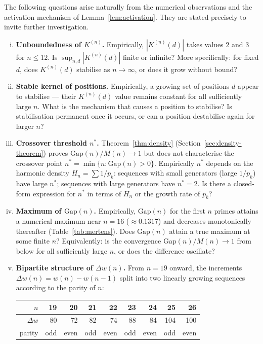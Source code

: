\documentclass[11pt,a4paper]{amsart}
\theoremstyle{plain}
\theoremstyle{definition}
\theoremstyle{remark}
\begin{document}
The following questions arise naturally from the numerical observations
and the activation mechanism of Lemma~\ref{lem:activation}.
They are stated precisely to invite further investigation.

\begin{enumerate}[(i)]

\item \textbf{Unboundedness of $K^{(n)}$.}
Empirically, $|K^{(n)}(d)|$ takes values $2$ and $3$ for $n \leq 12$.
Is $\sup_{n,d} |K^{(n)}(d)|$ finite or infinite?
More specifically: for fixed $d$, does $K^{(n)}(d)$ stabilise as
$n \to \infty$, or does it grow without bound?

\item \textbf{Stable kernel of positions.}
Empirically, a growing set of positions $d$ appear to stabilise ---
their $K^{(n)}(d)$ value remains constant for all sufficiently large $n$.
What is the mechanism that causes a position to stabilise?
Is stabilisation permanent once it occurs, or can a position
destabilise again for larger $n$?

\item \textbf{Crossover threshold $n^*$.}
Theorem~\ref{thm:density} (Section~\ref{sec:density-theorem}) proves
$\mathrm{Gap}(n)/M(n) \to 1$ but does not characterise the crossover
point $n^* = \min\{n : \mathrm{Gap}(n) > 0\}$. Empirically $n^*$ depends
on the harmonic density $H_n = \sum 1/p_k$: sequences with small
generators (large $1/p_k$) have large $n^*$; sequences with large
generators have $n^* = 2$. Is there a closed-form expression for $n^*$
in terms of $H_n$ or the growth rate of $p_k$?

\item \textbf{Maximum of $\mathrm{Gap}(n)$.}
Empirically, $\mathrm{Gap}(n)$ for the first $n$ primes attains a
numerical maximum near $n=16$ ($\approx 0.1317$) and decreases monotonically
thereafter (Table~\ref{tab:mertens}). Does $\mathrm{Gap}(n)$ attain a
true maximum at some finite $n$? Equivalently: is the convergence
$\mathrm{Gap}(n)/M(n) \to 1$ from below for all sufficiently large $n$,
or does the difference oscillate?

\item \textbf{Bipartite structure of $\Delta w(n)$.}
From $n=19$ onward, the increments $\Delta w(n) = w(n) - w(n-1)$
split into two linearly growing sequences according to the parity of $n$:

\begin{center}
\begin{tabular}{r|rrrrrrrr}
\hline
$n$ & 19 & 20 & 21 & 22 & 23 & 24 & 25 & 26 \\
\hline
$\Delta w$ & 80 & 72 & 82 & 74 & 88 & 84 & 104 & 100 \\
parity & odd & even & odd & even & odd & even & odd & even \\
\hline
\end{tabular}
\end{center}


\end{enumerate}
\end{document}
